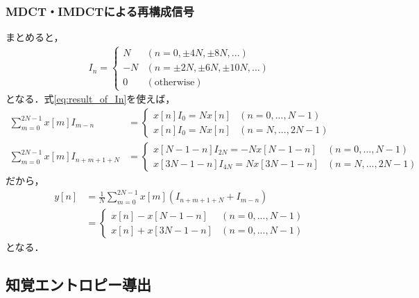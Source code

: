 \documentclass[14pt,xcolor=dvipsnames,table,dvipdfmx]{beamer}
\begin{document}
\begin{frame}[c]
    \frametitle{MDCT・IMDCTによる再構成信号}
    \scriptsize
    まとめると，
    \begin{align}
        I_{n} = \left\{ \begin{array}{ll}
            N & (n = 0, \pm 4N, \pm 8N, ...) \\
            -N & (n = \pm 2N, \pm 6N, \pm 10N, ...) \\
            0 & (\text{otherwise})
        \end{array} \right. \label{eq:result_of_In}
    \end{align}
    となる．式\eqref{eq:result_of_In}を使えば，
    \begin{align*}
        \sum_{m = 0}^{2N - 1} x[m] I_{m - n} &= \left\{ \begin{array}{ll}
            x[n] I_{0} = N x[n] & (n = 0, ..., N - 1) \\
            x[n] I_{0} = N x[n] & (n = N, ..., 2N - 1)
        \end{array} \right. \\
        \sum_{m = 0}^{2N - 1} x[m] I_{n + m + 1 + N} &= \left\{ \begin{array}{ll}
            x[N - 1 - n] I_{2N} = -N x[N - 1 - n] & (n = 0, ..., N - 1) \\
            x[3N - 1 - n] I_{4N} = N x[3N - 1 - n] & (n = N, ..., 2N - 1)
        \end{array} \right.
    \end{align*}
    だから，
    \begin{align*}
        y[n] &= \frac{1}{N} \sum_{m = 0}^{2N - 1} x[m] ( I_{n + m + 1 + N} + I_{m - n} ) \\
        &= \left\{ \begin{array}{ll}
            x[n] - x[N - 1 - n] & (n = 0, ..., N - 1) \\
            x[n] + x[3N - 1 - n] & (n = 0, ..., N - 1)
        \end{array} \right.
    \end{align*}
    となる．
\end{frame}

\subsection{知覚エントロピー導出 \cite{johnston1988estimation}} \label{sec:proofs_perceptual_entropy}
\end{document}
